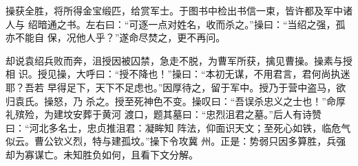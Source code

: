 操获全胜，将所得金宝缎匹，给赏军士。于图书中检出书信一束，皆许都及军中诸人与
绍暗通之书。左右曰：“可逐一点对姓名，收而杀之。”操曰：“当绍之强，孤亦不能自
保，况他人乎？”遂命尽焚之，更不再问。

却说袁绍兵败而奔，沮授因被囚禁，急走不脱，为曹军所获，擒见曹操。操素与授相
识。授见操，大呼曰：“授不降也！”操曰：“本初无谋，不用君言，君何尚执迷耶？吾若
早得足下，天下不足虑也。”因厚待之，留于军中。授乃于营中盗马，欲归袁氏。操怒，乃
杀之。授至死神色不变。操叹曰：“吾误杀忠义之士也！”命厚礼殡殓，为建坟安葬于黄河
渡口，题其墓曰：“忠烈沮君之墓。”后人有诗赞曰：“河北多名士，忠贞推沮君：凝眸知
阵法，仰面识天文；至死心如铁，临危气似云。曹公钦义烈，特与建孤坟。”操下令攻冀
州。正是：势弱只因多算胜，兵强却为寡谋亡。未知胜负如何，且看下文分解。